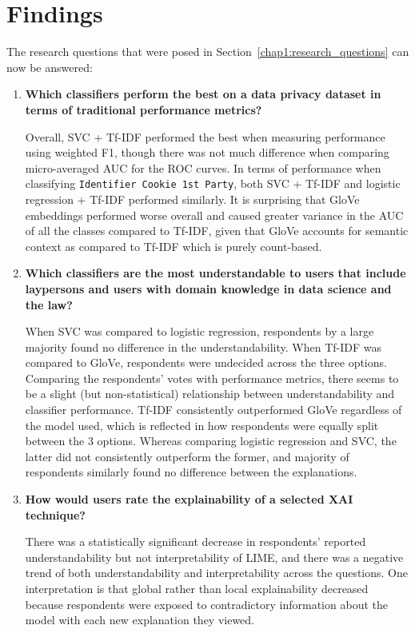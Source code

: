 \section{Findings}
The research questions that were posed in Section~\ref{chap1:research_questions} can now be answered:
\begin{enumerate}
    \item \textbf{Which classifiers perform the best on a data privacy dataset in terms of traditional performance metrics?}
    
    Overall, SVC + Tf-IDF performed the best when measuring performance using weighted F1, though there was not much difference when comparing micro-averaged AUC for the ROC curves. In terms of performance when classifying \texttt{Identifier Cookie 1st Party}, both SVC + Tf-IDF and logistic regression + Tf-IDF performed similarly. It is surprising that GloVe embeddings performed worse overall and caused greater variance in the AUC of all the classes compared to Tf-IDF, given that GloVe accounts for semantic context as compared to Tf-IDF which is purely count-based.

    \item \textbf{Which classifiers are the most understandable to users that include laypersons and users with domain knowledge in data science and the law?}
    
    When SVC was compared to logistic regression, respondents by a large majority found no difference in the understandability. When Tf-IDF was compared to GloVe, respondents were undecided across the three options. Comparing the respondents' votes with performance metrics, there seems to be a slight (but non-statistical) relationship between understandability and classifier performance. Tf-IDF consistently outperformed GloVe regardless of the model used, which is reflected in how respondents were equally split between the 3 options. Whereas comparing logistic regression and SVC, the latter did not consistently outperform the former, and majority of respondents similarly found no difference between the explanations.

    \item \textbf{How would users rate the explainability of a selected XAI technique?}
    
    There was a statistically significant decrease in respondents' reported understandability but not interpretability of LIME, and there was a negative trend of both understandability and interpretability across the questions. One interpretation is that global rather than local explainability decreased because respondents were exposed to contradictory information about the model with each new explanation they viewed.


\end{enumerate}
